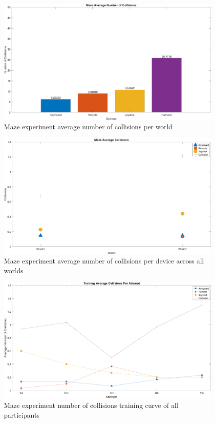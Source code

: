 \begin{figure}[ht]
   \centering
   \includegraphics[width=1.0\textwidth]{img/maze/mazeAvgColl.png}
   \caption{Maze experiment average number of collisions per world}
   \label{img:mazeAvgColl}
\end{figure}

\begin{figure}[ht]
   \centering
   \includegraphics[width=1.0\textwidth]{img/maze/mazeAvgColl2.png}
   \caption{Maze experiment average number of collisions per device across all worlds}
   \label{img:mazeAvgColl2}
\end{figure}

\begin{figure}[ht]
   \centering
   \includegraphics[width=1.0\textwidth]{img/maze/mazeTrainColl.png}
   \caption{Maze experiment number of collisions training curve of all participants}
   \label{img:mazeTrainColl}
\end{figure}

